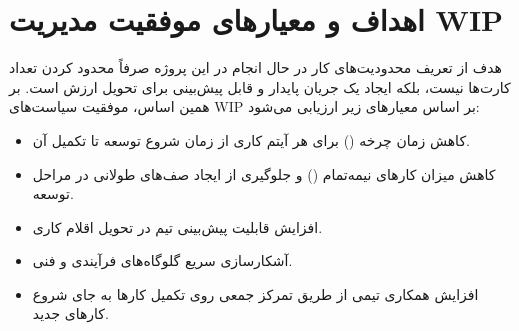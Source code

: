 \section{اهداف و معیارهای موفقیت مدیریت WIP}

هدف از تعریف محدودیت‌های کار در حال انجام در این پروژه صرفاً محدود کردن تعداد کارت‌ها نیست، بلکه ایجاد یک جریان پایدار و قابل پیش‌بینی برای تحویل ارزش است. بر همین اساس، موفقیت سیاست‌های WIP بر اساس معیارهای زیر ارزیابی می‌شود:

\begin{itemize}

\item کاهش زمان چرخه () برای هر آیتم کاری از زمان شروع توسعه تا تکمیل آن.

\item کاهش میزان کارهای نیمه‌تمام () و جلوگیری از ایجاد صف‌های طولانی در مراحل توسعه.

\item افزایش قابلیت پیش‌بینی تیم در تحویل اقلام کاری.

\item آشکارسازی سریع گلوگاه‌های فرآیندی و فنی.

\item افزایش همکاری تیمی از طریق تمرکز جمعی روی تکمیل کارها به جای شروع کارهای جدید.

\end{itemize}